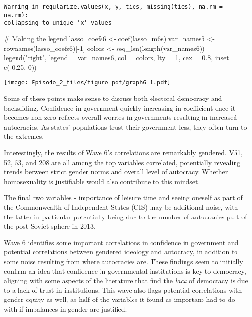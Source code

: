 \documentclass[
  letterpaper,
  DIV=11,
  numbers=noendperiod]{scrartcl}
\newenvironment{Shaded}{\begin{snugshade}}{\end{snugshade}}
\newcommand{\AttributeTok}[1]{\textcolor[rgb]{0.40,0.45,0.13}{#1}}
\newcommand{\CommentTok}[1]{\textcolor[rgb]{0.37,0.37,0.37}{#1}}
\newcommand{\DecValTok}[1]{\textcolor[rgb]{0.68,0.00,0.00}{#1}}
\newcommand{\FloatTok}[1]{\textcolor[rgb]{0.68,0.00,0.00}{#1}}
\newcommand{\FunctionTok}[1]{\textcolor[rgb]{0.28,0.35,0.67}{#1}}
\newcommand{\NormalTok}[1]{\textcolor[rgb]{0.00,0.23,0.31}{#1}}
\newcommand{\OtherTok}[1]{\textcolor[rgb]{0.00,0.23,0.31}{#1}}
\newcommand{\SpecialCharTok}[1]{\textcolor[rgb]{0.37,0.37,0.37}{#1}}
\newcommand{\StringTok}[1]{\textcolor[rgb]{0.13,0.47,0.30}{#1}}
\begin{document}
\begin{verbatim}
Warning in regularize.values(x, y, ties, missing(ties), na.rm = na.rm):
collapsing to unique 'x' values
\end{verbatim}

\begin{Shaded}
\begin{Highlighting}[]
\CommentTok{\# Making the legend}
\NormalTok{lasso\_coefs6 }\OtherTok{\textless{}{-}} \FunctionTok{coef}\NormalTok{(lasso\_m6s)}
\NormalTok{var\_names6 }\OtherTok{\textless{}{-}} \FunctionTok{rownames}\NormalTok{(lasso\_coefs6)[}\SpecialCharTok{{-}}\DecValTok{1}\NormalTok{]}
\NormalTok{colors }\OtherTok{\textless{}{-}} \FunctionTok{seq\_len}\NormalTok{(}\FunctionTok{length}\NormalTok{(var\_names6))}
\FunctionTok{legend}\NormalTok{(}\StringTok{"right"}\NormalTok{, }\AttributeTok{legend =}\NormalTok{ var\_names6, }\AttributeTok{col =}\NormalTok{ colors, }\AttributeTok{lty =} \DecValTok{1}\NormalTok{, }\AttributeTok{cex =} \FloatTok{0.8}\NormalTok{, }\AttributeTok{inset =} \FunctionTok{c}\NormalTok{(}\SpecialCharTok{{-}}\FloatTok{0.25}\NormalTok{, }\DecValTok{0}\NormalTok{))}
\end{Highlighting}
\end{Shaded}

\texttt{[image: Episode\_2\_files/figure-pdf/graph6-1.pdf]}

Some of these points make sense to discuss both electoral democracy and
backsliding. Confidence in government quickly increasing in coefficient
once it becomes non-zero reflects overall worries in governments
resulting in increased autocracies. As states' populations trust their
government less, they often turn to the extremes.

Interestingly, the results of Wave 6's correlations are remarkably
gendered. V51, 52, 53, and 208 are all among the top variables
correlated, potentially revealing trends between strict gender norms and
overall level of autocracy. Whether homosexuality is justifiable would
also contribute to this mindset.

The final two variables - importance of leisure time and seeing oneself
as part of the Commonwealth of Independent States (CIS) may be
additional noise, with the latter in particular potentially being due to
the number of autocracies part of the post-Soviet sphere in 2013.

Wave 6 identifies some important correlations in confidence in
government and potential correlations between gendered ideology and
autocracy, in addition to some noise resulting from where autocracies
are. These findings seem to initially confirm an idea that confidence in
governmental institutions is key to democracy, aligning with some
aspects of the literature that find the \emph{lack} of democracy is due
to a lack of trust in institutions. This wave also flags potential
correlations with gender equity as well, as half of the variables it
found as important had to do with if imbalances in gender are justified.
\end{document}
